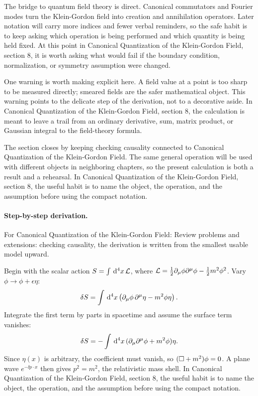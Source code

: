 The bridge to quantum field theory is direct.  Canonical commutators and Fourier modes turn the Klein-Gordon field into creation and annihilation operators.  Later notation will carry more indices and fewer verbal reminders, so the safe habit is to keep asking which operation is being performed and which quantity is being held fixed.  At this point in Canonical Quantization of the Klein-Gordon Field, section 8, it is worth asking what would fail if the boundary condition, normalization, or symmetry assumption were changed.

One warning is worth making explicit here.  A field value at a point is too sharp to be measured directly; smeared fields are the safer mathematical object.  This warning points to the delicate step of the derivation, not to a decorative aside.  In Canonical Quantization of the Klein-Gordon Field, section 8, the calculation is meant to leave a trail from an ordinary derivative, sum, matrix product, or Gaussian integral to the field-theory formula.

The section closes by keeping checking causality connected to Canonical Quantization of the Klein-Gordon Field.  The same general operation will be used with different objects in neighboring chapters, so the present calculation is both a result and a rehearsal.  In Canonical Quantization of the Klein-Gordon Field, section 8, the useful habit is to name the object, the operation, and the assumption before using the compact notation.



\paragraph{Step-by-step derivation.}

For Canonical Quantization of the Klein-Gordon Field: Review problems and extensions: checking causality, the derivation is written from the smallest usable model upward.

Begin with the scalar action \(S=\int\,\mathrm d^4x\,\mathcal L\), where \(\mathcal L=\frac12\partial_\mu\phi\partial^\mu\phi-\frac12m^2\phi^2\).  Vary \(\phi\to\phi+\epsilon\eta\):
\[
  \delta S=\int\,\mathrm d^4x\left(\partial_\mu\phi\,\partial^\mu\eta-m^2\phi\eta\right).
\]
Integrate the first term by parts in spacetime and assume the surface term vanishes:
\[
  \delta S=-\int\,\mathrm d^4x\,(\partial_\mu\partial^\mu\phi+m^2\phi)\eta.
\]
Since \(\eta(x)\) is arbitrary, the coefficient must vanish, so \((\Box+m^2)\phi=0\).  A plane wave \(e^{-\ii p\cdot x}\) then gives \(p^2=m^2\), the relativistic mass shell.  In Canonical Quantization of the Klein-Gordon Field, section 8, the useful habit is to name the object, the operation, and the assumption before using the compact notation.


